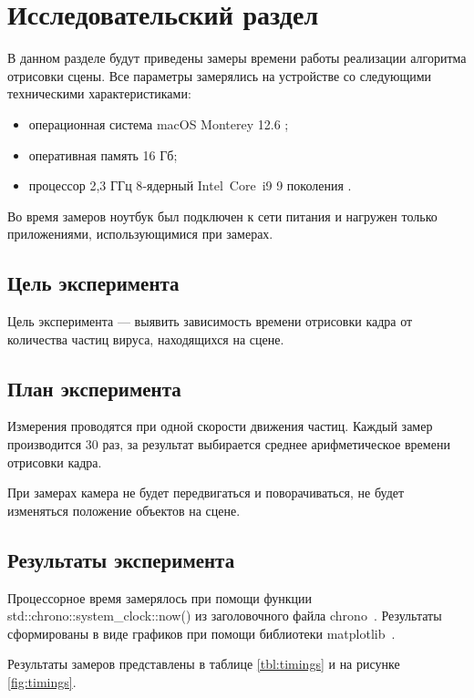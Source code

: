 \chapter{Исследовательский раздел}
\label{cha:research}

В данном разделе будут приведены замеры времени работы реализации алгоритма отрисовки сцены.
Все параметры замерялись на устройстве со следующими техническими характеристиками:
\begin{itemize}
	\item операционная система macOS Monterey 12.6 \cite{monterey};
	\item оперативная память 16 Гб;
	\item процессор 2,3 ГГц 8‑ядерный Intel Core i9 9 поколения \cite{intel}.
\end{itemize}

Во время замеров ноутбук был подключен к сети питания и нагружен только приложениями, использующимися при замерах.

\section{Цель эксперимента}

Цель эксперимента --- выявить зависимость времени отрисовки кадра от количества частиц вируса, находящихся на сцене. 

\section{План эксперимента}

Измерения проводятся при одной скорости движения частиц. Каждый замер производится 30 раз, за результат выбирается среднее арифметическое времени отрисовки кадра.

При замерах камера не будет передвигаться и поворачиваться, не будет изменяться положение объектов на сцене.

\section{Результаты эксперимента}

Процессорное время замерялось при помощи функции std::chrono::system\_clock::now() из заголовочного файла chrono~\cite{cplusplus}. Результаты сформированы в виде графиков при помощи библиотеки matplotlib~\cite{matplotlib}. 

Результаты замеров представлены в таблице \ref{tbl:timings} и на рисунке \ref{fig:timings}.

